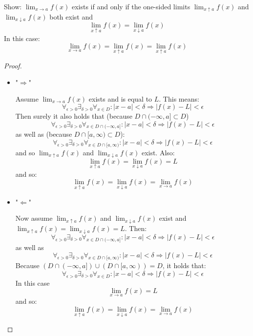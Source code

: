 \documentclass[week=6]{homework}
\begin{document}
\begin{questions}
        Show: $\lim_{x \to a} f(x)$ exists if and only if the one-sided limits $\lim_{x \uparrow a} f(x)$ and $\lim_{x \downarrow a} f(x)$ both exist and 
        \[
	        \lim_{x \uparrow a} f(x) = \lim_{x \downarrow a} f(x)
        \]
        In this case:
        \[
	        \lim_{x \to a} f(x) = \lim_{x \uparrow a} f(x) = \lim_{x \uparrow a} f(x)
        \]
        \begin{proof}
	        
	        \begin{itemize}
	        	\item "$\Rightarrow$"
	        	
	        	Assume $\lim_{x \to a} f(x)$ exists and is equal to $L$. This means:
	        	\[
		        	\forall_{\epsilon > 0} \exists_{\delta > 0} \forall_{x \in D} : |x - a| < \delta \Rightarrow |f(x) - L| < \epsilon
	        	\]
	        	Then surely it also holds that (because $D \cap (-\infty, a] \subset D$)
	        	\[
		        	\forall_{\epsilon > 0} \exists_{\delta > 0} \forall_{x \in D \cap (-\infty, a]} : |x - a| < \delta \Rightarrow |f(x) - L| < \epsilon
	        	\]
	        	as well as (because $D \cap [a, \infty) \subset D$): 
	        	\[
		        	\forall_{\epsilon > 0} \exists_{\delta > 0} \forall_{x \in D \cap [a, \infty)} : |x - a| < \delta \Rightarrow |f(x) - L| < \epsilon
	        	\]
	        	and so $\lim_{x \uparrow a} f(x)$ and $\lim_{x \downarrow a} f(x)$ exist. Also:
	        	\[
		        	\lim_{x \uparrow a} f(x) = \lim_{x \downarrow a} f(x) = L
	        	\]
	        	and so:
	        	\[
		        	\lim_{x \uparrow a} f(x) = \lim_{x \downarrow a} f(x) = \lim_{x \to a} f(x)
	        	\]
	        	
	        	\item "$\Leftarrow$"
	        	
	        	Now assume $\lim_{x \uparrow a} f(x)$ and $\lim_{x \downarrow a} f(x)$ exist and $\lim_{x \uparrow a} f(x) = \lim_{x \downarrow a} f(x) = L$. Then:
	        	\[
		        	\forall_{\epsilon > 0} \exists_{\delta > 0} \forall_{x \in D \cap (-\infty, a]} : |x - a| < \delta \Rightarrow |f(x) - L| < \epsilon
	        	\]
	        	as well as
	        	\[
		        	\forall_{\epsilon > 0} \exists_{\delta > 0} \forall_{x \in D \cap [a, \infty)} : |x - a| < \delta \Rightarrow |f(x) - L| < \epsilon
	        	\]
	        	Because $(D \cap (-\infty, a]) \cup (D \cap [a, \infty)) = D$, it holds that:
	        	\[
		        	\forall_{\epsilon > 0} \exists_{\delta > 0} \forall_{x \in D} : |x - a| < \delta \Rightarrow |f(x) - L| < \epsilon
		        \]
		        In this case
		        \[
						\lim_{x \to a} f(x) = L	        
		        \]
		        and so:
		        \[
			        \lim_{x \uparrow a} f(x) = \lim_{x \downarrow a} f(x) = \lim_{x \to a} f(x)
		        \]
	        	

\end{itemize}
\end{proof}
\end{questions}
\end{document}
